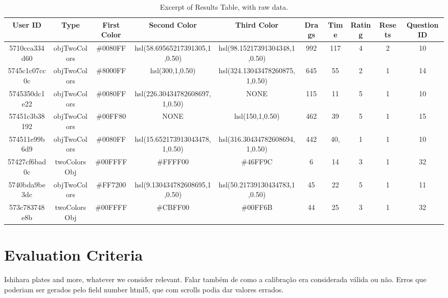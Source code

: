 %
\begin{table}[htbp]
  \resizebox{\textwidth}{!} {
  \begin{tabular} {|c|c|c|c|c|c|c|c|c|c|}
    \hline
    User ID & Type & First Color & Second Color & Third Color & Drags & Time & Rating & Resets & Question ID \\ \hline \hline
    5710cca334d60 & objTwoColors & \#0080FF & hsl(58.69565217391305,1,0.50) & hsl(98.15217391304348,1,0.50) & 992 & 117 & 4 & 2 & 10 \\ \hline
    5745c1c07cc0c & objTwoColors & \#8000FF & hsl(300,1,0.50) & hsl(324.13043478260875,1,0.50) & 645 & 55 & 2 & 1 & 14 \\ \hline
    5745350dc1e22 & objTwoColors & \#0080FF & hsl(226.30434782608697,1,0.50) & NONE & 115 & 11 & 5 & 1 & 10 \\ \hline
    57451c3b38192 & objTwoColors & \#00FF80 & NONE & hsl(150,1,0.50) & 462 & 39 & 5 & 1 & 15 \\ \hline
    574511e99b6d9 & objTwoColors & \#0080FF & hsl(15.652173913043478,1,0.50) & hsl(316.30434782608694,1,0.50) & 442 & 40, & 1 & 1 & 10 \\ \hline
    57427cf6bad0c & twoColorsObj & \#00FFFF & \#FFFF00 & \#46FF9C & 6 & 14 & 3 & 1 & 32 \\ \hline
    5740bda9be3dc & objTwoColors & \#FF7200 & hsl(9.130434782608695,1,0.50) & hsl(50.21739130434783,1,0.50) & 45 & 22 & 5 & 1 & 11 \\ \hline
    573c783748e8b & twoColorsObj & \#00FFFF & \#CBFF00 & \#00FF6B & 44 & 25 & 3 & 1 & 32 \\
    \hline
  \end{tabular}}
  \caption[Excerpt of Raw "Results" Table]{Excerpt of Results Table, with raw data.}
  \label{table:csv_resultsraw}
\end{table} \par
%

%
\section{Evaluation Criteria}
\label{sec:impl_evaluationcriteria}
Ishihara plates and more, whatever we consider relevant. Falar também de como a calibração era considerada válida ou não. Erros
que poderiam ser gerados pelo field number html5, que com scrolls podia dar valores errados. \\
